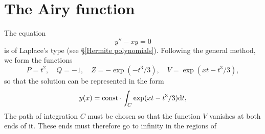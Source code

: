 \section{The Airy function}\label{The Airy function}
The equation
\begin{equation}\label{b.1}
y''-xy=0
\end{equation}
is of Laplace’s type (see \S\ref{Hermite polynomials}). Following the general method, we form the functions
\[ P=t^2,\quad Q=-1,\quad Z=-\exp(-t^3/3),\quad V=\exp(xt-t^3/3), \]
so that the solution can be represented in the form
\begin{equation}\label{b.2}
y(x)=\mathrm{const}\cdot\int_C\exp(xt-t^3/3)\mathrm{d} t,
\end{equation}
The path of integration $ C $ must be chosen so that the function $ V $ vanishes at both ends of it. These ends must therefore go to infinity in the regions of
